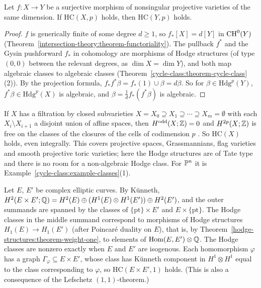 \begin{proposition}\label{hodge-conjecture:proposition-dominant-maps}
Let $f \colon X \to Y$ be a surjective morphism of nonsingular projective varieties of the same dimension. If $\mathrm{HC}(X, p)$ holds, then $\mathrm{HC}(Y, p)$ holds.
\end{proposition}

\begin{proof}
$f$ is generically finite of some degree $d \geq 1$, so $f_*[X] = d[Y]$ in $\operatorname{CH}^0(Y)$ (Theorem~\ref{intersection-theory:theorem-functoriality}). The pullback $f^*$ and the Gysin pushforward $f_*$ in
cohomology are morphisms of Hodge structures (of type $(0,0)$ between the relevant degrees, as $\dim X = \dim Y$), and both map algebraic classes to algebraic classes
(Theorem~\ref{cycle-class:theorem-cycle-class}(2)). By the projection formula, $f_*f^*\beta = f_*(1) \cup \beta = d\beta$. So for $\beta \in \mathrm{Hdg}^p(Y)$, $f^*\beta \in \mathrm{Hdg}^p(X)$ is algebraic,
and $\beta = \frac1df_*(f^*\beta)$ is algebraic.
\end{proof}

\begin{example}\label{hodge-conjecture:example-cellular}
If $X$ has a filtration by closed subvarieties $X = X_0 \supseteq X_1 \supseteq \cdots \supseteq X_m = \emptyset$ with each $X_i \setminus X_{i+1}$ a disjoint union of affine spaces, then
$H^{\mathrm{odd}}(X; \mathbb{Z}) = 0$ and $H^{2p}(X; \mathbb{Z})$ is free on the classes of the closures of the cells of codimension $p$ \cite[Example 19.1.11]{fulton-intersection}. So $\mathrm{HC}(X)$
holds, even integrally. This covers projective spaces, Grassmannians, flag varieties and smooth projective toric varieties; here the Hodge structures are of Tate type and there is
no room for a non-algebraic Hodge class. For $\mathbb{P}^n$ it is Example~\ref{cycle-class:example-classes}(1).
\end{example}

\begin{example}\label{hodge-conjecture:example-elliptic-product}
Let $E$, $E'$ be complex elliptic curves. By K\"unneth,
$H^2(E \times E'; \mathbb{Q}) = H^2(E) \oplus (H^1(E) \otimes H^1(E')) \oplus H^2(E')$, and the outer summands are spanned by the classes of $\{\mathrm{pt}\} \times E'$ and $E \times \{\mathrm{pt}\}$.
The Hodge classes in the middle summand correspond to morphisms of Hodge structures $H_1(E) \to H_1(E')$ (after Poincar\'e duality on $E$), that is, by
Theorem~\ref{hodge-structures:theorem-weight-one}, to elements of $\operatorname{Hom}(E, E') \otimes \mathbb{Q}$. The Hodge classes are nonzero exactly when $E$ and $E'$ are isogenous. Each homomorphism
$\varphi$ has a graph $\Gamma_\varphi \subseteq E \times E'$, whose class has K\"unneth component in $H^1 \otimes H^1$ equal to the class corresponding to $\varphi$, so $\mathrm{HC}(E \times E', 1)$ holds.
(This is also a consequence of the Lefschetz $(1,1)$-theorem.)
\end{example}

